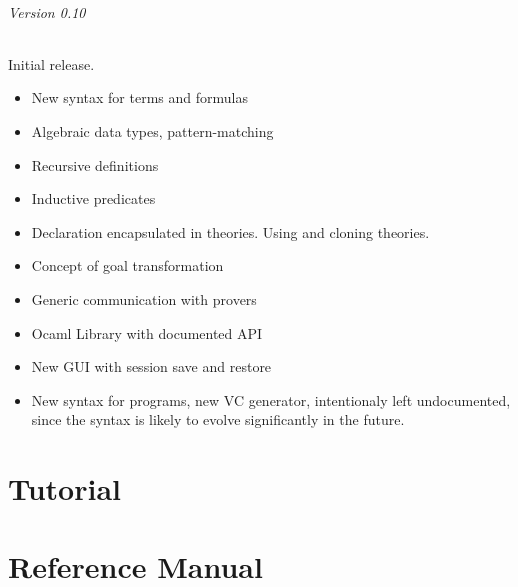\documentclass[a4paper,11pt,twoside,openright]{memoir}
\begin{document}
\paragraph{Version 0.10}
Initial release. 
\begin{itemize}
\item New syntax for terms and formulas
\item Algebraic data types, pattern-matching
\item Recursive definitions
\item Inductive predicates
\item Declaration encapsulated in theories. Using and cloning theories.
\item Concept of goal transformation
\item Generic communication with provers
\item Ocaml Library with documented API
\item New GUI with session save and restore
\item New syntax for programs, new VC generator, intentionaly left
  undocumented, since the syntax is likely to evolve significantly in
  the future.
\end{itemize}
\cleardoublepage

\tableofcontents




\part{Tutorial}





% 

% 



\part{Reference Manual}

% 











%

\cleardoublepage
\printindex
\end{document}
